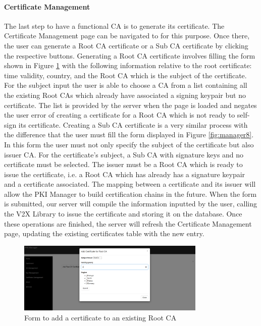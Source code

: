 \paragraph{Certificate Management}
The last step to have a functional CA is to generate its certificate. The Certificate Management page  can be navigated to for this purpose. Once there, the user can generate a Root CA certificate or a Sub CA certificate by clicking the respective buttons. Generating a Root CA certificate involves filling the form shown in Figure \ref{fig:manager7} with the following information relative to the root certificate: time validity, country, and the Root CA which is the subject of the certificate. For the subject input the user is able to choose a CA from a list containing all the existing Root CAs which already have associated a signing keypair but no certificate. The list is provided by the server when the page is loaded and negates the user error of creating a certificate for a Root CA which is not ready to self-sign its certificate. Creating a Sub CA certificate is a very similar process with the difference that the user must fill the form displayed in Figure \ref{fig:manager8}. In this form the user must not only specify the subject of the certificate but also issuer CA. For the certificate's subject, a Sub CA with signature keys and no certificate must be selected. The issuer must be a Root CA which is ready to issue the certificate, i.e. a Root CA which has already has a signature keypair and a certificate associated. The mapping between a certificate and its issuer will allow the PKI Manager to build certification chains in the future. When the form is submitted, our server will compile the information inputted by the user, calling the V2X Library to issue the certificate and storing it on the database. Once these operations are finished, the server will refresh the Certificate Management page, updating the existing certificates table with the new entry. 

\begin{figure}[!h]
	\centering
	\includegraphics[width=0.8\textwidth]{Figures/manager7}
	\caption{\label{fig:manager7}Form to add a certificate to an existing Root CA}
\end{figure}

